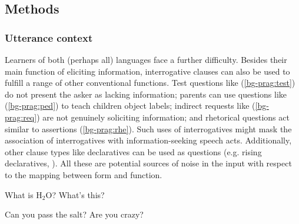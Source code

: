 \subsection{Methods}
\label{sec:engsp:corpus:method}
\subsubsection{Utterance context}

Learners of both (perhaps all) languages face a further difficulty. Besides their main function of eliciting information, interrogative clauses can also be used to fulfill a range of other conventional functions. Test questions like (\ref{bg-prag:test}) do not present the asker as lacking information; parents can use questions like (\ref{bg-prag:ped}) to teach children object labels; indirect requests like (\ref{bg-prag:req}) are not genuinely soliciting information; and rhetorical questions act similar to assertions (\ref{bg-prag:rhe}). Such uses of interrogatives might mask the association of interrogatives with information-seeking speech acts. Additionally, other clause types like declaratives can be used as questions (e.g. rising declaratives, \citealt{gunlogson2004,gunlogson2008,jeong2018,rudin2018}). All these are potential sources of noise in the input with respect to the mapping between form and function.

\bxl\label{bg-prag:test}
What is H$_{2}$O?		\hfill {}
\ex \label{bg-prag:ped}
What's this?	\hfill {}
\exl
\eex

\bex{}
\bxl\label{bg-prag:req}
Can you pass the salt?			\hfill {}
\ex \label{bg-prag:rhe}
Are you crazy?	\hfill {}
\exl
\eex



